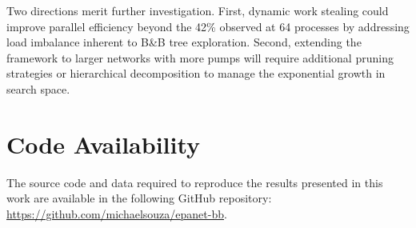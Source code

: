 \documentclass[final,3p,twocolumn]{elsarticle}
\begin{document}
Two directions merit further investigation. First, dynamic work stealing could improve parallel efficiency beyond the 42\% observed at 64 processes by addressing load imbalance inherent to B\&B tree exploration. Second, extending the framework to larger networks with more pumps will require additional pruning strategies or hierarchical decomposition to manage the exponential growth in search space.

\section*{Code Availability}

The source code and data required to reproduce the results presented in this work are available in the following GitHub repository: \url{https://github.com/michaelsouza/epanet-bb}.



\end{document}
